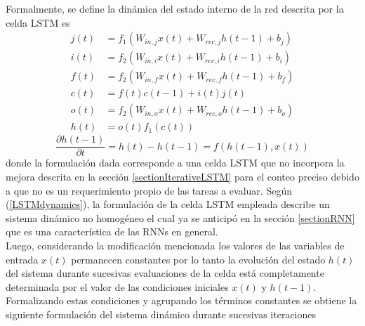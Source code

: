 \documentclass{article}
\begin{document}
	Formalmente, se define la dinámica del estado interno de la red descrita por la celda LSTM es
	\begin{equation*}
	\begin{split}
	j(t) &= f_1(W_{in, j} x(t) + W_{rec, j} h(t-1) + b_{j})\\
	i(t) &= f_2(W_{in, i} x(t) + W_{rec, i} h(t-1) + b_{i})\\
	f(t) &= f_2(W_{in, f} x(t) + W_{rec, f} h(t-1) + b_f)\\
	c(t) &= f(t)c(t-1) + i(t)j(t)\\
	o(t) &= f_2(W_{in, o} x(t) + W_{rec, o} h(t-1) + b_o)\\
	h(t) &= o(t)f_1(c(t))
	\end{split}
	\end{equation*}
	\begin{equation}\label{LSTMdynamics}
	\dfrac{\partial h(t-1)}{\partial t} = h(t) - h(t-1) = f(h(t-1), x(t))
	\end{equation}
	donde la formulación dada corresponde a una celda LSTM que no incorpora la mejora descrita en la sección \ref{sectionIterativeLSTM} para el conteo preciso debido a que no es un requerimiento propio de las tareas a evaluar. Según (\ref{LSTMdynamics}), la formulación de la celda LSTM empleada describe un sistema dinámico no homogéneo el cual ya se anticipó en la sección \ref{sectionRNN} que es una característica de las RNNs en general.\\
	Luego, considerando la modificación mencionada los valores de las variables de entrada $x(t)$ permanecen constantes por lo tanto la evolución del estado $h(t)$ del sistema durante sucesivas evaluaciones de la celda está completamente determinada por el valor de las condiciones iniciales $x(t)$ y $h(t-1)$. Formalizando estas condiciones y agrupando los términos constantes se obtiene la siguiente formulación del sistema dinámico durante sucesivas iteraciones
	
\end{document}
